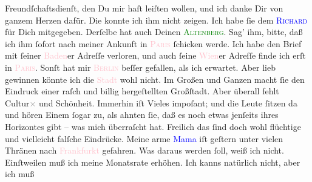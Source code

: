                Freundſchaftsdienſt, den Du mir haſt leiſten wollen, und ich danke Dir von ganzem
               Herzen dafür. Die \label{K_L02784-11v}\label{K_L02784-11h}{ }{\pb}konnte ich ihm nicht zeigen. Ich habe ſie dem \textsc{\textcolor{blue}{Richard }{}\ledrightnote{\textcolor{blue}{Richard Beer-Hofmann}}} für Dich mitgegeben. Derſelbe hat auch Deinen \textsc{\textcolor{blue}{\textcolor{green}{Altenberg}{}}{}\ledrightnote{\textcolor{blue}{Peter Altenberg}}}. Sag’ ihm, bitte, daß ich ihm \label{K_L02784-12v}\label{K_L02784-12h} ſofort nach
               meiner Ankunft in \textsc{\textcolor{pink}{Paris}{}\ledrightnote{\textcolor{pink}{Paris}}} ſchicken werde. Ich habe  den Brief mit ſeiner \textcolor{pink}{Baden}{}\ledrightnote{\textcolor{pink}{Baden bei Wien}}er Adreſſe
               verloren, und auch ſeine \textcolor{pink}{Wien}{}\ledrightnote{\textcolor{pink}{Wien}}er Adreſſe finde ich
               erſt in \textsc{\textcolor{pink}{Paris}{}\ledrightnote{\textcolor{pink}{Paris}}}.\pend
           \pstart
           Sonſt hat mir \textsc{\textcolor{pink}{Berlin}{}\ledrightnote{\textcolor{pink}{Berlin}}} beſſer gefallen, als ich erwartet. Aber lieb {\pb}gewinnen könnte ich die \textcolor{pink}{Stadt}{}
               wohl nicht. Im Großen und Ganzen macht ſie den Eindruck\strikeout{\textcolor{gray}{,}} einer raſch und billig hergeſtellten Großſtadt. Aber überall fehlt Cultur\textcolor{gray}{\textcolor{gray}{×}} und Schönheit. Immerhin iſt Vieles impoſant; und die Leute ſitzen da und
               hören Einem  ſogar zu, als ahnten ſie, daß es
               noch etwas jenſeits ihres Horizontes gibt – was mich überraſcht hat. Freilich das
               ſind {\pb}doch wohl flüchtige und vielleicht falſche
               Eindrücke.\pend
           \pstart
           Meine arme \textcolor{blue}{Mama}{} iſt geſtern unter vielen Thränen nach \textcolor{pink}{Frankfurkt}{}\ledrightnote{\textcolor{pink}{Frankfurt am Main}} gefahren. Was daraus werden ſoll, weiß ich nicht.
               Einſtweilen muß ich meine Monatsrate erhöhen. Ich kanns natürlich nicht, aber ich muß
